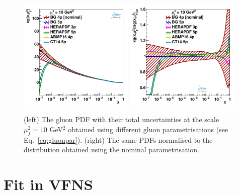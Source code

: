 \documentclass[12pt]{article}
\begin{document}
\begin{figure}
    \centering
    \includegraphics[width=0.49\textwidth]{figs/gluonpar/q2_10_pdf_g.pdf}
    \includegraphics[width=0.49\textwidth]{figs/gluonpar/q2_10_pdf_g_ratio.pdf}
    \caption{(left) The gluon PDF with their total uncertainties at the scale $\mu^2_f=10$ GeV$^2$ obtained using different gluon parametrisations (see Eq.~\ref{eq:gluonpar}). (right) The same PDFs normalised to the distribution obtained using the nominal parametrisation.}
    \label{fig:gluonpar}
\end{figure}

\section{Fit in VFNS}
\label{sec:vfns}
\end{document}
